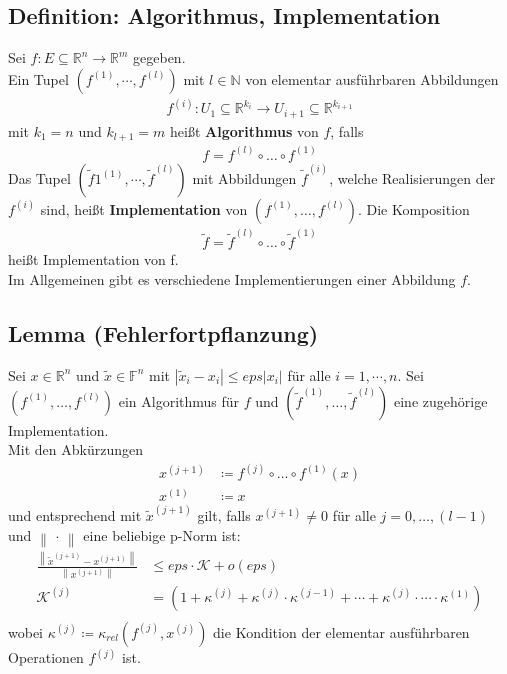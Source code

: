 \documentclass[ngerman,fontsize=11pt, paper=a4, parskip=half, titlepage=true, toc=bib]{scrbook}
\newcommand{\R}{\mathds{R}}
\newcommand{\Ren}{\mathds{R}^{n}}
\newcommand{\N}{\mathds{N}}
\newcommand{\F}{\mathds{F}}
\newcommand{\K}{\mathcal{K}}
\newcommand{\nn}[1]{\left\| #1 \right\|}
\begin{document}
  \subsection{Definition: Algorithmus, Implementation}
  Sei $f:E\subseteq \Ren \rightarrow \R^m$ gegeben.\\
  Ein Tupel $\left(f^{(1)},\cdots ,f^{(l)}\right)$ mit $l\in \N$ von elementar ausführbaren
  Abbildungen
  \begin{gather*}
    f^{(i)}: U_1\subseteq \R^{k_i} \rightarrow U_{i+1}\subseteq \R^{k_{i+1}}
  \end{gather*}
  mit $k_1=n$ und $k_{l+1}=m$ heißt \textbf{Algorithmus} von $f$, falls
  \begin{gather*}
    f=f	^{(l)}\circ \dotsc \circ f^{(1)}
  \end{gather*}
  Das Tupel $(\widetilde{f}1^{(1)},\cdots ,\widetilde{f}^{(l)})$ mit Abbildungen $\widetilde{f}^{(i)}$, welche Realisierungen der $f^{(i)}$ sind,
  heißt \textbf{Implementation} von 
  $\left(f^{(1)},\dotsc ,f^{(l)}\right)$.
  Die Komposition 
  \begin{gather*}
    \widetilde{f}=\widetilde{f}	^{(l)}\circ \dotsc \circ \widetilde{f}^{(1)}
  \end{gather*}
  heißt Implementation von f. \\
  Im Allgemeinen gibt es verschiedene Implementierungen einer Abbildung $f$.

  \subsection{Lemma (Fehlerfortpflanzung)}\label{3.3.5} 
  Sei $x\in \Ren$ und $\widetilde{x}\in \F^n$ mit $|\widetilde{x}_i-x_i|\leq eps|x_i|$ für alle 
  $i=1,\cdots , n$.
  Sei $\left(f^{(1)},\dotsc ,f^{(l)}\right)$ ein Algorithmus für $f$ und 
  $(\widetilde{f}^{(1)},\dotsc ,\widetilde{f}^{(l)})$ eine zugehörige Implementation. \\
  Mit den Abkürzungen
  \begin{align*}
    x^{(j+1)} &\coloneqq f^{(j)}\circ \dotsc \circ f^{(1)}(x) \\
    x^{(1)} &\coloneqq x
  \end{align*}
  und entsprechend mit $\widetilde{x}^{(j+1)}$ gilt,
  falls $x^{(j+1)} \neq 0$ für alle $j=0,\dotsc , (l-1)$ und $\nn{\,\cdot\,}$ eine beliebige p-Norm ist:
  \begin{align}
    \frac{\nn{\widetilde{x}^{(j+1)}-x^{(j+1)}}}{\nn{x^{(j+1)}}}
    &\leq eps \cdot \K + o\left(eps\right)
      \label{III.3.4} 
    \\ \nonumber
    \K^{(j)}&=(1+\kappa^{(j)}+\kappa^{(j)}\cdot \kappa^{(j-1)}+ \cdots + \kappa^{(j)}\cdot \dotsm \cdot \kappa^{(1)}) \\ \nonumber
  \end{align}
  wobei $	\kappa^{(j)} \coloneqq \kappa_{rel}(f^{(j)}, x^{(j)})$ die Kondition der elementar ausführbaren Operationen $f^{(j)}$ ist.
\end{document}
